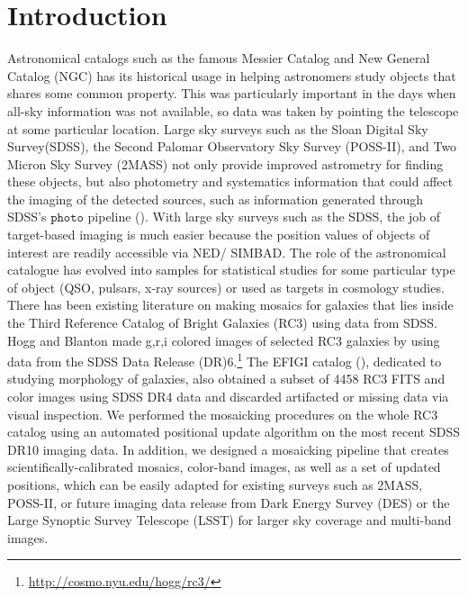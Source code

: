 \documentclass[5p]{elsarticle}
\begin{document}
\section{Introduction}
Astronomical catalogs such as the famous Messier Catalog and New General Catalog (NGC) has its historical usage in helping  astronomers  study objects that shares some common property. This was particularly important in the days when all-sky information was not available, so data was taken by pointing the telescope at some particular location.  
Large sky surveys such as the Sloan Digital Sky Survey(SDSS), the Second Palomar Observatory Sky Survey (POSS-II), and Two Micron Sky Survey (2MASS) not only provide improved astrometry for finding these objects, but also photometry and systematics information that could affect the imaging of the detected sources, such as information generated through SDSS's $\texttt{photo}$ pipeline (\citealp{photopaper}).
With large sky surveys such as the SDSS, the job of target-based imaging is much  easier because the position values of objects of interest are readily accessible via NED/ SIMBAD. The role of the astronomical catalogue has evolved into samples for statistical studies for some particular type of object (QSO, pulsars, x-ray sources) or used as targets in cosmology studies.
\\
\indent
There has been existing literature on making mosaics for galaxies that lies inside the Third Reference Catalog of Bright Galaxies  (RC3) using data from SDSS. Hogg and Blanton made g,r,i colored images of selected RC3 galaxies by using data from the SDSS Data Release (DR)6.\footnote{\url{http://cosmo.nyu.edu/hogg/rc3/}} The EFIGI catalog (\citealp{efigi}), dedicated to studying morphology of galaxies, also  obtained a subset of 4458 RC3 FITS and color images using SDSS DR4 data and discarded artifacted or missing data via visual inspection. We performed the mosaicking procedures on the whole RC3 catalog using an automated positional update algorithm on the most recent SDSS DR10 imaging data. In addition, we designed a mosaicking pipeline that creates scientifically-calibrated mosaics, color-band images, as well as a set of updated positions, which can be easily adapted for existing surveys such as 2MASS, POSS-II, or future imaging data release from  Dark Energy Survey (DES) or the Large Synoptic Survey Telescope (LSST) for larger sky coverage and multi-band images.
\end{document}
